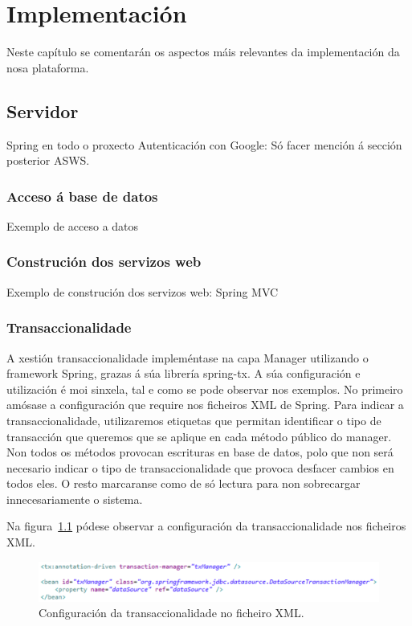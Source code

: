 \chapter{Implementación}

Neste capítulo se comentarán os aspectos máis relevantes da implementación da nosa plataforma.


\section{Servidor}
Spring en todo o proxecto
Autenticación con Google: Só facer mención á sección posterior
ASWS.

\subsection{Acceso á base de datos}
Exemplo de acceso a datos

\subsection{Construción dos servizos web}
Exemplo de construción dos servizos web: Spring MVC












\subsection{Transaccionalidade}
A xestión transaccionalidade impleméntase na capa Manager utilizando o framework Spring, grazas á súa librería spring-tx. A súa configuración e utilización é moi sinxela, tal e como se pode observar nos exemplos. No primeiro amósase a configuración que require nos ficheiros XML de Spring. Para indicar a transaccionalidade, utilizaremos etiquetas que permitan identificar o tipo de transacción que queremos que se aplique en cada método público do manager. Non todos os métodos provocan escrituras en base de datos, polo que non será necesario indicar o tipo de transaccionalidade que provoca desfacer cambios en todos eles. O resto marcaranse como de só lectura para non sobrecargar innecesariamente o sistema.

Na figura~\ref{fig:transaccionConfiguracion} pódese observar a configuración da transaccionalidade nos ficheiros XML.

\begin{figure}[tbh] 
	\begin{center}
		\includegraphics[width=1\textwidth]{figures/codigo/transaccionConfiguracion}
		\caption{Configuración da transaccionalidade no ficheiro XML.}
		\label{fig:transaccionConfiguracion}
	\end{center}
\end{figure}


